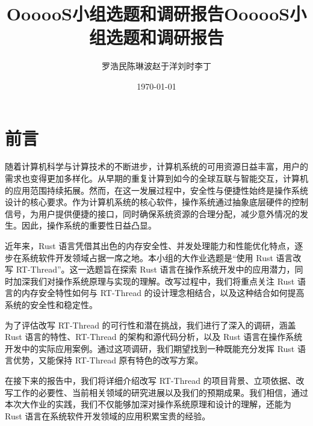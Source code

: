\documentclass[12pt]{ctexart}
\title{OooooS小组选题和调研报告}
\title{OooooS小组选题和调研报告}
\author{罗浩民\;陈琳波\;赵于洋\;刘时\;李丁}
\date{\today}
\begin{document}
\maketitle

\section{前言}
随着计算机科学与计算技术的不断进步，计算机系统的可用资源日益丰富，用户的需求也变得更加多样化。从早期的重复计算到如今的全球互联与智能交互，计算机的应用范围持续拓展。然而，在这一发展过程中，安全性与便捷性始终是操作系统设计的核心要求。作为计算机系统的核心软件，操作系统通过抽象底层硬件的控制信号，为用户提供便捷的接口，同时确保系统资源的合理分配，减少意外情况的发生。因此，操作系统的重要性日益凸显。

近年来，Rust 语言凭借其出色的内存安全性、并发处理能力和性能优化特点，逐步在系统软件开发领域占据一席之地。本小组的大作业选题是“使用 Rust 语言改写 RT-Thread”。这一选题旨在探索 Rust 语言在操作系统开发中的应用潜力，同时加深我们对操作系统原理与实现的理解。改写过程中，我们将重点关注 Rust 语言的内存安全特性如何与 RT-Thread 的设计理念相结合，以及这种结合如何提高系统的安全性和稳定性。

为了评估改写 RT-Thread 的可行性和潜在挑战，我们进行了深入的调研，涵盖 Rust 语言的特性、RT-Thread 的架构和源代码分析，以及 Rust 语言在操作系统开发中的实际应用案例。通过这项调研，我们期望找到一种既能充分发挥 Rust 语言优势，又能保持 RT-Thread 原有特色的改写方案。

在接下来的报告中，我们将详细介绍改写 RT-Thread 的项目背景、立项依据、改写工作的必要性、当前相关领域的研究进展以及我们的预期成果。我们相信，通过本次大作业的实践，我们不仅能够加深对操作系统原理和设计的理解，还能为 Rust 语言在系统软件开发领域的应用积累宝贵的经验。
\newpage
\tableofcontents
\newpage







\end{document}
